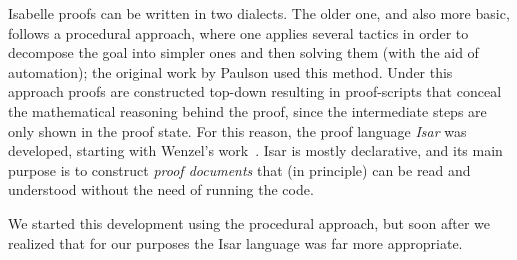 Isabelle proofs can be written in two dialects.  The older one, and
also more basic, follows a procedural approach, where one applies
several tactics in order to decompose the goal into simpler ones and
then solving them (with the aid of automation); the original work by
Paulson used this method. Under this approach proofs are constructed
top-down resulting in proof-scripts that conceal the mathematical
reasoning behind the proof, since the intermediate steps are only
shown in the proof state. For this reason, the proof language
\emph{Isar} was developed, starting with Wenzel's
work~\cite{DBLP:conf/tphol/Wenzel99}. Isar is mostly declarative, and
its main purpose is to construct \emph{proof documents} that (in
principle) can be read and understood without the need of running the
code.

We started this development using the procedural approach, but soon
after we realized that for our purposes the Isar language was far more
appropriate.


